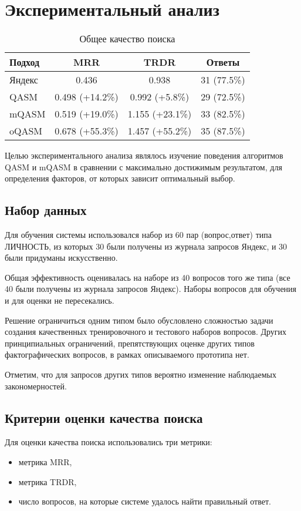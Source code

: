 \documentclass{article}
\begin{document}
\section{Экспериментальный анализ}

\begin{table*}[tb]
\begin{center}
\begin{tabular}{|l|c|c|c|}
\hline
Подход & MRR & TRDR & Ответы \\
\hline
\hline
Яндекс & 0.436 & 0.938 & 31 (77.5\%) \\
\hline
QASM &  0.498 (+14.2\%) & 0.992 (+5.8\%) & 29 (72.5\%) \\
mQASM & 0.519 (+19.0\%) & 1.155 (+23.1\%) & 33 (82.5\%)  \\
\hline
oQASM & 0.678 (+55.3\%) & 1.457 (+55.2\%) & 35 (87.5\%) \\
\hline
\end{tabular}
\caption{Общее качество поиска}
\label{table:efficiency}
\end{center}
\end{table*}


Целью экспериментального анализа являлось изучение поведения алгоритмов
QASM и mQASM в сравнении с максимально достижимым результатом,
для определения факторов, от которых зависит оптимальный выбор.

\subsection{Набор данных}
Для обучения системы использовался набор из 60 пар (вопрос,ответ) типа ЛИЧНОСТЬ,
из которых 30 были получены из журнала запросов Яндекс,
и 30 были придуманы искусственно.

Общая эффективность оценивалась на наборе из 40 вопросов того же типа
(все 40 были получены из журнала запросов Яндекс).
Наборы вопросов для обучения и для оценки не пересекались.

Решение ограничиться одним типом было обусловлено сложностью задачи создания
качественных тренировочного и тестового наборов вопросов.
Других принципиальных ограничений, препятствующих оценке других типов 
фактографических вопросов, в рамках описываемого прототипа нет. 

Отметим, что для запросов других типов вероятно
изменение наблюдаемых закономерностей.

\subsection{Критерии оценки качества поиска}
Для оценки качества поиска использовались три метрики:
\begin{itemize}
\item метрика MRR,
\item метрика TRDR,
\item число вопросов, на которые системе удалось найти правильный ответ.
\end{itemize}
\end{document}

